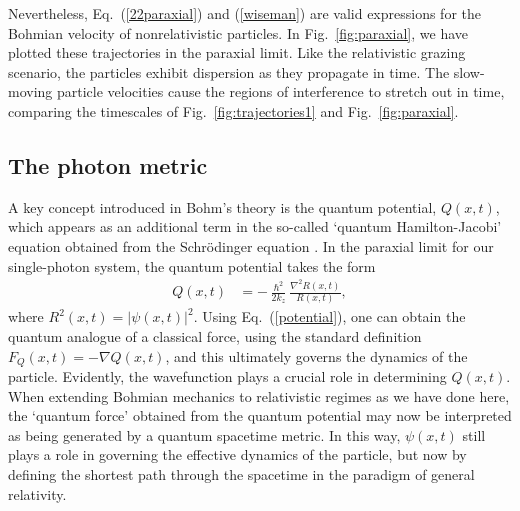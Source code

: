 \documentclass[12pt,prx,
,nofootinbib
,floatfix
,superscriptaddress
]{revtex4-2}
\begin{document}
Nevertheless, Eq.\ (\ref{22paraxial}) and (\ref{wiseman}) are valid expressions for the Bohmian velocity of nonrelativistic particles. In Fig.\ \ref{fig:paraxial}, we have plotted these trajectories in the paraxial limit. Like the relativistic grazing scenario, the particles exhibit dispersion as they propagate in time. The slow-moving particle velocities cause the regions of interference to stretch out in time, comparing the timescales of Fig.\ \ref{fig:trajectories1} and Fig.\ \ref{fig:paraxial}. 


\subsection{The photon metric}
A key concept introduced in Bohm's theory is the quantum potential, $Q(x,t)$, which appears as an additional term in the so-called `quantum Hamilton-Jacobi' equation obtained from the Schr\"odinger equation \cite{bohm2006undivided}. In the paraxial limit for our single-photon system, the quantum potential takes the form
\begin{align}\label{potential}
    Q(x,t) &= - \frac{\hslash^2}{2k_z} \frac{\nabla^2 R(x,t)}{R(x,t)} ,
\end{align}
where $R^2(x,t) = | \psi(x,t) |^2$. Using Eq.\ (\ref{potential}), one can obtain the quantum analogue of a classical force, using the standard definition $F_Q(x,t) = - \nabla Q(x,t)$, and this ultimately governs the dynamics of the particle. Evidently, the wavefunction plays a crucial role in determining $Q(x,t)$. When extending Bohmian mechanics to relativistic regimes as we have done here, the `quantum force' obtained from the quantum potential may now be interpreted as being generated by a quantum spacetime metric. In this way, $\psi(x,t)$ still plays a role in governing the effective dynamics of the particle, but now by defining the shortest path through the spacetime in the paradigm of general relativity. 
\end{document}
